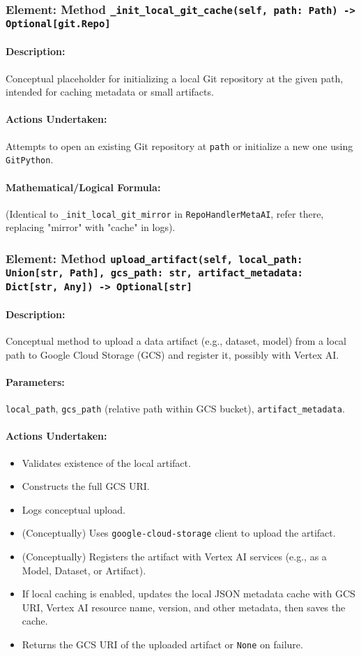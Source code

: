 \documentclass{article}
\begin{document}
\subsubsection{Element: Method \texttt{\_init\_local\_git\_cache(self, path: Path) -> Optional[git.Repo]}}
\paragraph{Description:} Conceptual placeholder for initializing a local Git repository at the given path, intended for caching metadata or small artifacts.
\paragraph{Actions Undertaken:} Attempts to open an existing Git repository at \texttt{path} or initialize a new one using \texttt{GitPython}.
\paragraph{Mathematical/Logical Formula:} (Identical to \texttt{\_init\_local\_git\_mirror} in \texttt{RepoHandlerMetaAI}, refer there, replacing "mirror" with "cache" in logs).

\subsubsection{Element: Method \texttt{upload\_artifact(self, local\_path: Union[str, Path], gcs\_path: str, artifact\_metadata: Dict[str, Any]) -> Optional[str]}}
\paragraph{Description:} Conceptual method to upload a data artifact (e.g., dataset, model) from a local path to Google Cloud Storage (GCS) and register it, possibly with Vertex AI.
\paragraph{Parameters:} \texttt{local\_path}, \texttt{gcs\_path} (relative path within GCS bucket), \texttt{artifact\_metadata}.
\paragraph{Actions Undertaken:}
\begin{itemize}
    \item Validates existence of the local artifact.
    \item Constructs the full GCS URI.
    \item Logs conceptual upload.
    \item (Conceptually) Uses \texttt{google-cloud-storage} client to upload the artifact.
    \item (Conceptually) Registers the artifact with Vertex AI services (e.g., as a Model, Dataset, or Artifact).
    \item If local caching is enabled, updates the local JSON metadata cache with GCS URI, Vertex AI resource name, version, and other metadata, then saves the cache.
    \item Returns the GCS URI of the uploaded artifact or \texttt{None} on failure.
\end{itemize}
\end{document}

